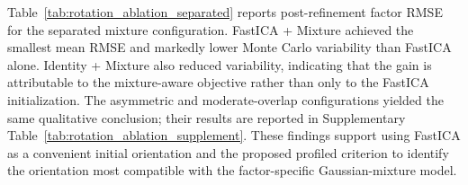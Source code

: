 Table~\ref{tab:rotation_ablation_separated} reports post-refinement factor
RMSE for the separated mixture configuration. FastICA + Mixture achieved the
smallest mean RMSE and markedly lower Monte Carlo variability than FastICA
alone. Identity + Mixture also reduced variability, indicating that the
gain is attributable to the mixture-aware objective rather than only to the
FastICA initialization. The asymmetric and moderate-overlap configurations
yielded the same qualitative conclusion; their results are reported in
Supplementary Table~\ref{tab:rotation_ablation_supplement}. These findings
support using FastICA as a convenient initial orientation and the proposed
profiled criterion to identify the orientation most compatible with the
factor-specific Gaussian-mixture model.


